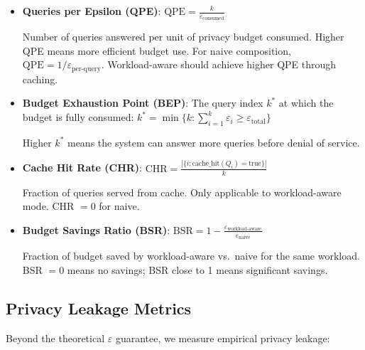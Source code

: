 \documentclass[sigconf,nonacm]{acmart}
\begin{document}
\begin{itemize}
    \item \textbf{Queries per Epsilon (QPE)}: $\text{QPE} = \frac{k}{\varepsilon_{\text{consumed}}}$

    Number of queries answered per unit of privacy budget consumed. Higher QPE means more efficient budget use. For naive composition, $\text{QPE} = 1/\varepsilon_{\text{per-query}}$. Workload-aware should achieve higher QPE through caching.

    \item \textbf{Budget Exhaustion Point (BEP)}: The query index $k^*$ at which the budget is fully consumed:
    $k^* = \min\{k : \sum_{i=1}^{k} \varepsilon_i \geq \varepsilon_{\text{total}}\}$

    Higher $k^*$ means the system can answer more queries before denial of service.

    \item \textbf{Cache Hit Rate (CHR)}: $\text{CHR} = \frac{|\{i : \text{cache\_hit}(Q_i) = \text{true}\}|}{k}$

    Fraction of queries served from cache. Only applicable to workload-aware mode. CHR $= 0$ for naive.

    \item \textbf{Budget Savings Ratio (BSR)}: $\text{BSR} = 1 - \frac{\varepsilon_{\text{workload-aware}}}{\varepsilon_{\text{naive}}}$

    Fraction of budget saved by workload-aware vs.\ naive for the same workload. BSR $= 0$ means no savings; BSR close to 1 means significant savings.
\end{itemize}

\subsection{Privacy Leakage Metrics}

Beyond the theoretical $\varepsilon$ guarantee, we measure empirical privacy leakage:
\end{document}
